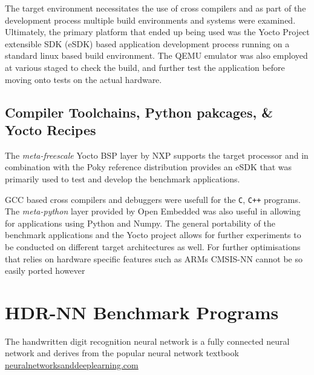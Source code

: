The target environment necessitates the use of cross compilers and as part of the development process multiple build environments and systems were examined. Ultimately, the primary platform that ended up being used was the Yocto Project extensible SDK (eSDK) based application development process running on a standard linux based build environment. The QEMU emulator was also employed at various staged to check the build, and further test the application before moving onto tests on the actual hardware.

\subsection{Compiler Toolchains, Python pakcages, \& Yocto Recipes}

The \textit{meta-freescale} Yocto BSP layer by NXP supports the target processor and in combination with the Poky reference distribution provides an eSDK that was primarily used to test and develop the benchmark applications.

GCC based cross compilers and debuggers were usefull for the \texttt{C}, \texttt{C++}  programs. The \textit{meta-python} layer provided by Open Embedded was also useful in allowing for applications using Python and Numpy. The general portability of the benchmark applications and the Yocto project allows for further experiments to be conducted on different target architectures as well. For further optimisations that relies on hardware specific features such as ARM\textquotesingle s CMSIS-NN cannot be so easily ported however

\section[Handwritten Digit Recognition (HDR)]{HDR-NN Benchmark Programs}

The handwritten digit recognition neural network is a fully connected neural network and derives from the popular neural network textbook \href{http://neuralnetworksanddeeplearning.com}{neuralnetworksanddeeplearning.com}

